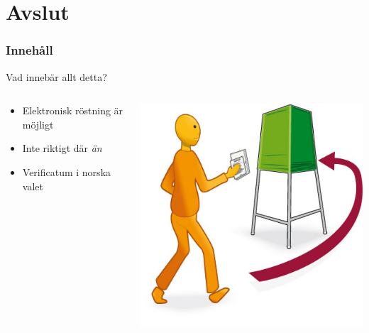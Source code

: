 \section{Avslut}
\begin{frame}
\frametitle{Innehåll}
\tableofcontents[currentsection]
\end{frame}

\begin{frame}{Vad innebär allt detta?}



\begin{columns}
    \begin{column}{0.6\textwidth}
        \begin{itemize}
			\item Elektronisk röstning är möjligt
			\item Inte riktigt där \emph{än}
			\item Verificatum i norska valet
		\end{itemize}
    \end{column}
	\begin{column}{0.4\textwidth}
    	\includegraphics[width=\textwidth]{images/rosta.jpg}
	\end{column}
\end{columns}

\end{frame}

